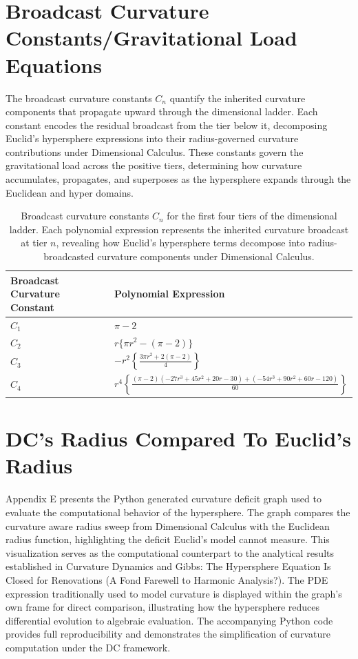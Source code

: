 \documentclass[final,onefignum,onetabnum]{siamart}
\begin{document}
\section{Broadcast Curvature Constants/Gravitational Load Equations}

The broadcast curvature constants $C_{n}$ quantify the inherited curvature components that propagate upward through the dimensional ladder. Each constant encodes the residual broadcast from the tier below it, decomposing Euclid’s hypersphere expressions into their radius-governed curvature contributions under Dimensional Calculus. These constants govern the gravitational load across the positive tiers, determining how curvature accumulates, propagates, and superposes as the hypersphere expands through the Euclidean and hyper domains.

\begin{table}[htbp]
\centering
\caption{Broadcast curvature constants $C_{n}$ for the first four tiers of the dimensional ladder. Each polynomial expression represents the inherited curvature broadcast at tier $n$, revealing how Euclid’s hypersphere terms decompose into radius-broadcasted curvature components under Dimensional Calculus.}
\label{tab:broadcast-constants}
\begin{tabular}{ll}
\hline
\textbf{Broadcast Curvature Constant} & \textbf{Polynomial Expression} \\
\hline
$C_{1}$ & $\pi - 2$ \\
$C_{2}$ & $r\{\pi r^{2} - (\pi - 2)\}$ \\
$C_{3}$ & $-r^{2}\left\{\frac{3\pi r^{2} + 2(\pi - 2)}{4}\right\}$ \\
$C_{4}$ & $r^{4}\left\{\frac{(\pi - 2)(-27r^{3} + 45r^{2} + 20r - 30) + (-54r^{3} + 90r^{2} + 60r - 120)}{60}\right\}$ \\
\hline
\end{tabular}
\end{table}

\section{DC's Radius Compared To Euclid's Radius}

Appendix E presents the Python generated curvature deficit graph used to evaluate the computational behavior of the hypersphere. The graph compares the curvature aware radius sweep from Dimensional Calculus with the Euclidean radius function, highlighting the deficit Euclid’s model cannot measure. This visualization serves as the computational counterpart to the analytical results established in Curvature Dynamics and Gibbs: The Hypersphere Equation Is Closed for Renovations (A Fond Farewell to Harmonic Analysis?). The PDE expression traditionally used to model curvature is displayed within the graph’s own frame for direct comparison, illustrating how the hypersphere reduces differential evolution to algebraic evaluation. The accompanying Python code provides full reproducibility and demonstrates the simplification of curvature computation under the DC framework.
\end{document}
